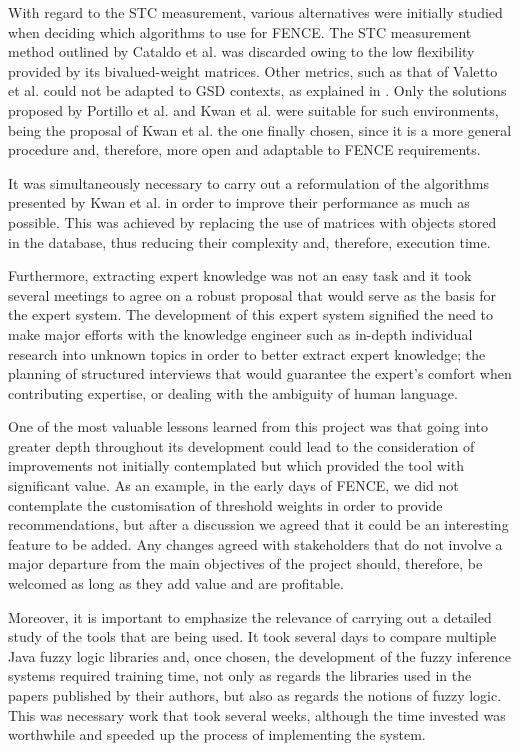 With regard to the STC measurement, various alternatives were initially studied when deciding which algorithms to use for FENCE. The STC measurement method outlined by Cataldo et al. \cite{cataldo_identification_2006, cataldo_socio-technical_2008} was discarded owing to the low flexibility provided by its bivalued-weight matrices. Other metrics, such as that of Valetto et al. \cite{valetto_using_2007} could not be adapted to GSD contexts, as explained in \cite{sierra_systematic_2018}. Only the solutions proposed by Portillo et al. \cite{portillo_2014} and Kwan et al. \cite{kwan_weighted_2009, kwan_does_2011} were suitable for such environments, being the proposal of Kwan et al. the one finally chosen, since it is a more general procedure and, therefore, more open and adaptable to FENCE requirements.

It was simultaneously necessary to carry out a reformulation of the algorithms presented by Kwan et al. in order to improve their performance as much as possible. This was achieved by replacing the use of matrices with objects stored in the database, thus reducing their complexity and, therefore, execution time.

Furthermore, extracting expert knowledge was not an easy task and it took several meetings to agree on a robust proposal that would serve as the basis for the expert system. The development of this expert system signified the need to make major efforts with the knowledge engineer such as in-depth individual research into unknown topics in order to better extract expert knowledge; the planning of structured interviews that would guarantee the expert's comfort when contributing expertise, or dealing with the ambiguity of human language.

One of the most valuable lessons learned from this project was that going into greater depth throughout its development could lead to the consideration of improvements not initially contemplated but which provided the tool with significant value. As an example, in the early days of FENCE, we did not contemplate the customisation of threshold weights in order to provide recommendations, but after a discussion we agreed that it could be an interesting feature to be added. Any changes agreed with stakeholders that do not involve a major departure from the main objectives of the project should, therefore, be welcomed as long as they add value and are profitable.

Moreover, it is important to emphasize the relevance of carrying out a detailed study of the tools that are being used. It took several days to compare multiple Java fuzzy logic libraries and, once chosen, the development of the fuzzy inference systems required training time, not only as regards the libraries used in the papers published by their authors, but also as regards the notions of fuzzy logic. This was necessary work that took several weeks, although the time invested was worthwhile and speeded up the process of implementing the system.

